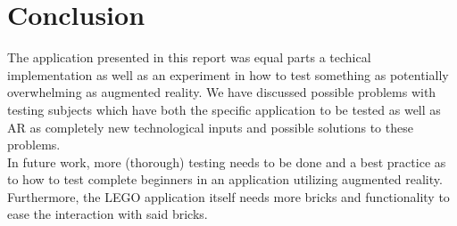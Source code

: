
\section{Conclusion}
The application presented in this report was equal parts a techical implementation as well as an experiment in how to test something as potentially overwhelming as augmented reality. We have discussed possible problems with testing subjects which have both the specific application to be tested as well as AR as completely new technological inputs and possible solutions to these problems.\\
In future work, more (thorough) testing needs to be done and a best practice as to how to test complete beginners in an application utilizing augmented reality. Furthermore, the LEGO application itself needs more bricks and functionality to ease the interaction with said bricks. 